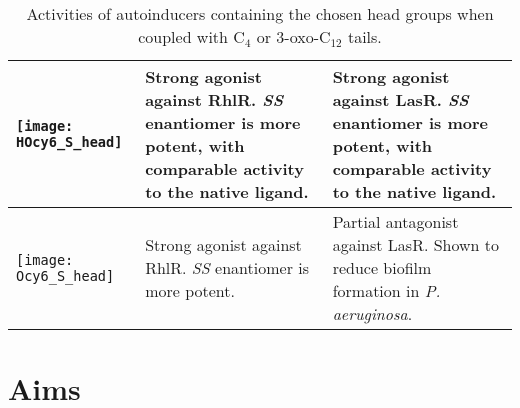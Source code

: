 \begin{table}[H]
\begin{tabular}{|P{0.18\textwidth}|p{0.32\textwidth}|p{0.32\textwidth}|}
\hline 
 \vspace{0px}\texttt{[image: HOcy6\_S\_head]} 
 & Strong agonist against RhlR\cite{Smith2003a}. \textit{SS} enantiomer is more potent, with comparable activity to the native ligand\cite{Jog2006}.
 & Strong agonist against LasR\cite{Smith2003,Smith2003a}. \textit{SS} enantiomer is more potent, with comparable activity to the native ligand\cite{Jog2006}.\\ 
\hline 
 \vspace{0px}\texttt{[image: Ocy6\_S\_head]} 
 & Strong agonist against RhlR\cite{Smith2003a}. \textit{SS} enantiomer is more potent\cite{Jog2006}.
 & Partial antagonist against LasR\cite{Smith2003a}. Shown to reduce biofilm formation in \textit{P. aeruginosa}\cite{Smith2003a}.\\ 
\hline 
\end{tabular}
\caption{Activities of autoinducers containing the chosen head groups when coupled with C$_4$ or 3-oxo-C$_{12}$ tails.\label{tbl:head_groups}} 
\end{table}


\newpage

\section{Aims}




